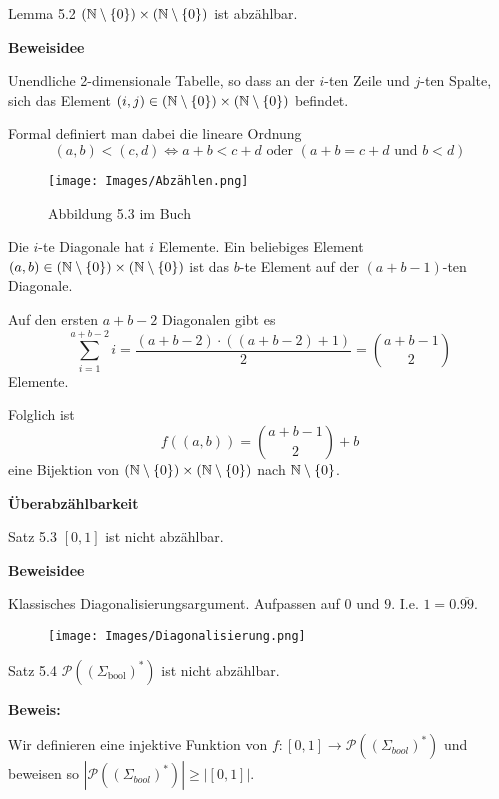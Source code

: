     \begin{mainbox}{Lemma 5.2}
        $(\mathbb{N}\setminus\{0\}) \times (\mathbb{N} \setminus \{0\})$ ist abzählbar.
    \end{mainbox}
    \textbf{Beweisidee}

    Unendliche 2-dimensionale Tabelle, so dass an der $i$-ten Zeile und $j$-ten Spalte, sich das Element $(i,j) \in (\mathbb{N}\setminus\{0\}) \times (\mathbb{N} \setminus \{0\})$ befindet.

    Formal definiert man dabei die lineare Ordnung 
    $$(a,b) < (c,d) \iff a+b < c+d \text{ oder }(a+b = c+d \text{ und } b <d)$$

    \begin{figure}[htp]
        \texttt{[image: Images/Abzählen.png]}
        \caption{Abbildung 5.3 im Buch}
    \end{figure}

    Die $i$-te Diagonale hat $i$ Elemente. Ein beliebiges Element $(a,b) \in (\mathbb{N}\setminus\{0\}) \times (\mathbb{N} \setminus \{0\})$ ist das $b$-te Element auf der $(a+b-1)$-ten Diagonale.
    
    Auf den ersten $a+b-2$ Diagonalen gibt es 
    $$\sum_{i = 1}^{a+b-2}i = \frac{(a+b-2)\cdot((a+b-2)+1)}{2} = \binom{a+b-1}{2}$$
    Elemente.

    Folglich ist 
    $$f((a,b)) = \binom{a+b-1}{2} + b$$
    eine Bijektion von $(\mathbb{N}\setminus\{0\}) \times (\mathbb{N} \setminus \{0\})$ nach $\mathbb{N}\setminus\{0\}$.



    \textbf{Überabzählbarkeit}

    \begin{mainbox}{Satz 5.3}
        $[0,1]$ ist nicht abzählbar.
    \end{mainbox}
    \textbf{Beweisidee}
    
    Klassisches Diagonalisierungsargument. Aufpassen auf $0$ und $9$. I.e. $1 = 0.\overline{99}$.

    \begin{figure}[htp]
        \texttt{[image: Images/Diagonalisierung.png]}
    \end{figure}

    \begin{mainbox}{Satz 5.4}
        $\mathcal{P}((\Sigma_{\text{bool}})^*)$ ist nicht abzählbar.
    \end{mainbox}
    \textbf{Beweis: }

        Wir definieren eine injektive Funktion von $f: [0, 1] \to \mathcal{P}((\Sigma_{bool})^*)$ und beweisen so $|\mathcal{P}((\Sigma_{bool})^*)| \geq |[0, 1]|$.
    
